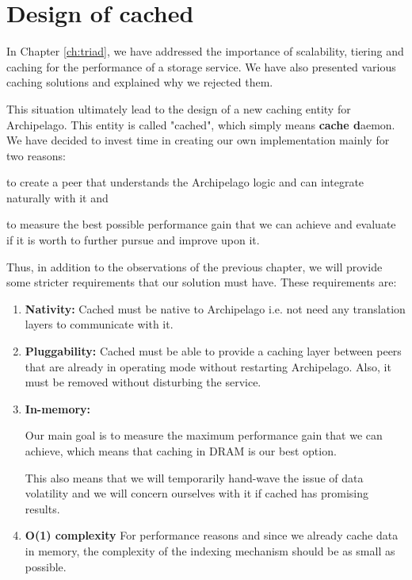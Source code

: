 \chapter{Design of cached}\label{ch:cached-design}

In Chapter \ref{ch:triad}, we have addressed the importance of scalability, 
tiering and caching for the performance of a storage service. We have also 
presented various caching solutions and explained why we rejected them.

This situation ultimately lead to the design of a new caching entity for 
Archipelago.  This entity is called "cached", which simply means \textbf{cache 
	d}aemon. We have decided to invest time in creating our own implementation 
mainly for two reasons:
\begin{inparaenum}[i)]
\item to create a peer that understands the Archipelago logic and can integrate 
	naturally with it and
\item to measure the best possible performance gain that we can achieve and 
	evaluate if it is worth to further pursue and improve upon it.
\end{inparaenum}

Thus, in addition to the observations of the previous chapter, we will provide 
some stricter requirements that our solution must have. These requirements are:

\begin{enumerate}
	\item \textbf{Nativity:} Cached must be native to Archipelago i.e.  not 
		need any translation layers to communicate with it.
	\item \textbf{Pluggability:} Cached must be able to provide a caching 
		layer between peers that are already in operating mode without 
		restarting Archipelago. Also, it must be removed without 
		disturbing the service.
	\item \textbf{In-memory:}
		\begin{comment}
		Our solution must cache requests in RAM, since the next fastest 
		tier, SSDs, are already being used in RADOS as a 
		journal.
		\end{comment}
		Our main goal is to measure the maximum performance gain that 
		we can achieve, which means that caching in DRAM is our best 
		option.
		
		This also means that we will temporarily hand-wave the issue of 
		data volatility and we will concern ourselves with it if cached 
		has promising results.
	\item \textbf{O(1) complexity} For performance reasons and since we 
		already cache data in memory, the complexity of the indexing 
		mechanism should be as small as possible.
\end{enumerate}

